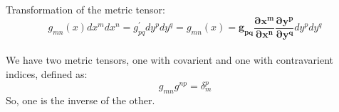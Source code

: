 Transformation of the metric tensor:
\begin{equation}
  g_{mn}(x) dx^m dx^n = g_{pq}^\prime dy^p dy^q = g_{mn}(x) = \mathbf{g_{pq} \frac{\partial x^m}{\partial x^n} \frac{\partial y^p}{\partial y^q}} dy^p dy^q
\end{equation}

\paragraph{} We have two metric tensors, one with covarient and one with contravarient indices, defined as:
\begin{equation}
  g_{mn} g^{np} = \delta_m^p
\end{equation}
So, one is the inverse of the other.



